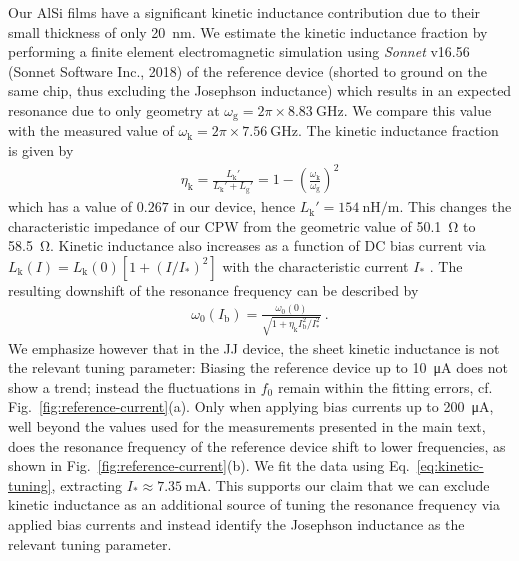 % 
Our AlSi films have a significant kinetic inductance contribution due to their small thickness of only \SI{20}{nm}.
% 
We estimate the kinetic inductance fraction by performing a finite element electromagnetic simulation using \textit{Sonnet} v16.56 (Sonnet Software Inc., 2018) of the reference device (shorted to ground on the same chip, thus excluding the Josephson inductance) which results in an expected resonance due to only geometry at $\omega_\text{g}=2\pi\times\SI{8.83}{\giga\hertz}$.
% 
We compare this value with the measured value of $\omega_\text{k}=2\pi\times\SI{7.56}{\giga\hertz}$.
% 
The kinetic inductance fraction is given by~\cite{gaoExperimentalStudyKinetic2006}
% 
\begin{align}
\eta_\text{k} = \frac{L_\text{k}'}{L_\text{k}'+L_\text{g}'}=1-\left(\frac{\omega_\text{k}}{\omega_\text{g}}\right)^2
\end{align}
% 
which has a value of $0.267$ in our device, hence $L_\text{k}'=\SI{154}{\nano\henry\per\meter}$.
%
This changes the characteristic impedance of our CPW from the geometric value of \SI{50.1}{\ohm} to \SI{58.5}{\ohm}.
% 
Kinetic inductance also increases as a function of DC bias current via $L_\text{k}(I)=L_\text{k}(0)\left[1+(I/I_*)^2\right]$ with the characteristic current $I_*$ \cite{annunziataTunableSuperconductingNanoinductors2010b}.
% 
The resulting downshift of the resonance frequency can be described by
% 
\begin{align}
\omega_0(I_\text{b}) = \frac{\omega_0(0)}{\sqrt{1+\eta_\text{k}I_\text{b}^2/I_*^{2}}} \ .
\label{eq:kinetic-tuning}
\end{align}
% 
We emphasize however that in the JJ device, the sheet kinetic inductance is not the relevant tuning parameter:
% 
Biasing the reference device up to \SI{10}{\micro\ampere} does not show a trend; instead the fluctuations in $f_0$ remain within the fitting errors, cf. Fig.~\ref{fig:reference-current}(a).
% 
Only when applying bias currents up to \SI{200}{\micro\ampere}, well beyond the values used for the measurements presented in the main text, does the resonance frequency of the reference device shift to lower frequencies, as shown in Fig.~\ref{fig:reference-current}(b).
% 
We fit the data using Eq.~\eqref{eq:kinetic-tuning}, extracting $I_*\approx\SI{7.35}{\milli\ampere}$.
% 
This supports our claim that we can exclude kinetic inductance as an additional source of tuning the resonance frequency via applied bias currents and instead identify the Josephson inductance as the relevant tuning parameter.


